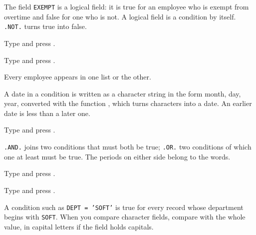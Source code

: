 The field \texttt{EXEMPT} is a logical field: it is true for an employee who
is exempt from overtime and false for one who is not.  A logical field is a
condition by itself.  \texttt{.NOT.} turns true into false.
\begin{Steps}[resume]
\item Type  and press .
\item Type  and press .
\end{Steps}
Every employee appears in one list or the other.

A date in a condition is written as a character string in the form month, day,
year, converted with the function , which turns characters into a
date.  An earlier date is less than a later one.
\begin{Steps}[resume]
\item Type  and press
.
\end{Steps}

\texttt{.AND.} joins two conditions that must both be true; \texttt{.OR.} two
conditions of which one at least must be true.  The periods on either side
belong to the words.
\begin{Steps}[resume]
\item Type  and press .
\end{Steps}
\begin{Steps}[resume]
\item Type  and
press .
\end{Steps}
\begin{Tip}
A condition such as \texttt{DEPT = 'SOFT'} is true for every record whose
department begins with \texttt{SOFT}.  When you compare character fields,
compare with the whole value, in capital letters if the field holds capitals.
\end{Tip}


